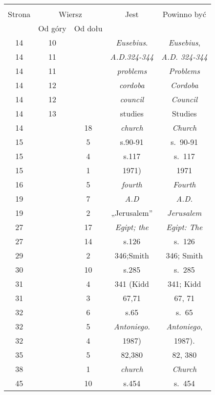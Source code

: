 \documentclass[a4paper,11pt]{article}
\begin{document}
\begin{center}

  \begin{tabular}{|c|c|c|c|c|}
    \hline
    & \multicolumn{2}{c|}{} & & \\
    Strona & \multicolumn{2}{c|}{Wiersz} & Jest
                              & Powinno być \\ \cline{2-3}
    & Od góry & Od dołu & & \\
    \hline
    14  & 10 & & \textit{Eusebius}. & \textit{Eusebius}, \\
    14  & 11 & & \textit{A.D.324-344} & \textit{A.D. 324-344} \\
    14  & 11 & & \textit{problems} & \textit{Problems} \\
    14  & 12 & & \textit{cordoba} & \textit{Cordoba} \\
    14  & 12 & & \textit{council} & \textit{Council} \\
    14  & 13 & & studies & Studies \\
    14  & & 18 & \textit{church} & \textit{Church} \\
    15  & &  5 & s.90-91 & s.~90-91 \\
    15  & &  4 & s.117 & s.~117 \\
    15  & &  1 & 1971) & 1971 \\
    16  & &  5 & \textit{fourth} & \textit{Fourth} \\
    19  & &  7 & \textit{A.D} & \textit{A.D.} \\
    19  & &  2 & „Jerusalem” & \textit{Jerusalem} \\
    27  & & 17 & \textit{Egipt; the} & \textit{Egipt: The} \\
    27  & & 14 & s.126 & s.~126 \\
    29  & &  2 & 346;Smith & 346; Smith\\
    30  & & 10 & s.285 & s.~285 \\
    31  & &  4 & 341 (Kidd & 341; Kidd \\
    31  & &  3 & 67,71 & 67, 71 \\
    32  & &  6 & s.65 & s.~65 \\
    32  & &  5 & \textit{Antoniego}. & \textit{Antoniego}, \\
    32  & &  4 & 1987) & 1987). \\
    35  & &  5 & 82,380 & 82, 380 \\
    38  & &  1 & \textit{church} & \textit{Church} \\
    45  & & 10 & s.454 & s.~454 \\

\end{tabular}
\end{center}
\end{document}

